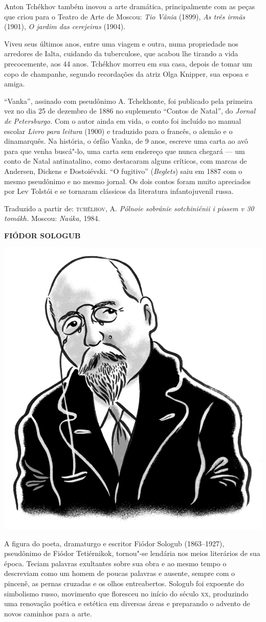 Anton Tchékhov também inovou a arte dramática, principalmente com as
peças que criou para o Teatro de Arte de Moscou: \emph{Tio Vânia}
(1899), \emph{As três irmãs} (1901), \emph{O jardim das cerejeiras}
(1904).

Viveu seus últimos anos, entre uma viagem e outra, numa propriedade nos
arredores de Ialta, cuidando da tuberculose, que acabou lhe tirando a
vida precocemente, aos 44 anos. Tchékhov morreu em sua casa, depois de
tomar um copo de champanhe, segundo recordações da atriz Olga Knipper,
sua esposa e amiga.

``Vanka'', assinado com pseudônimo A. Tchekhonte, foi publicado pela
primeira vez no dia 25 de dezembro de 1886 no suplemento ``Contos de
Natal'', do \emph{Jornal de Petersburgo.} Com o autor ainda em vida, o
conto foi incluído no manual escolar \emph{Livro para leitura} (1900) e
traduzido para o francês, o alemão e o dinamarquês. Na história, o órfão
Vanka, de 9 anos, escreve uma carta ao avô para que venha buscá"-lo, uma
carta sem endereço que nunca chegará --- um conto de Natal
antinatalino, como destacaram alguns críticos, com marcas de Andersen,
Dickens e Dostoiévski. ``O fugitivo'' (\emph{Beglets}) saiu em 1887 com
o mesmo pseudônimo e no mesmo jornal. Os dois contos foram muito
apreciados por Lev Tolstói e se tornaram clássicos da literatura
infantojuvenil russa.

Traduzido a partir de:
\textsc{tchélhov}, A. \emph{Pólnoie sobránie sotchiniénii i pissem v 30 tomákh.}
Moscou: \emph{Naúka,} 1984.

\bigskip
\noindent\textbf{FIÓDOR SOLOGUB}\medskip

\noindent\includegraphics[width=.8in]{./imgs/autor7.jpg}

\noindent{}A figura do poeta, dramaturgo e escritor Fiódor Sologub (1863--1927),
pseudônimo de Fiódor Tetiérnikok, tornou"-se lendária nos meios
literários de sua época. Teciam palavras exultantes sobre sua obra e ao
mesmo tempo o descreviam como um homem de poucas palavras e ausente,
sempre com o pincenê, as pernas cruzadas e os olhos entreabertos.
Sologub foi expoente do simbolismo russo, movimento que floresceu no início do
século \textsc{xx}, produzindo uma renovação poética e estética em diversas áreas
e preparando o advento de novos caminhos para a arte.

